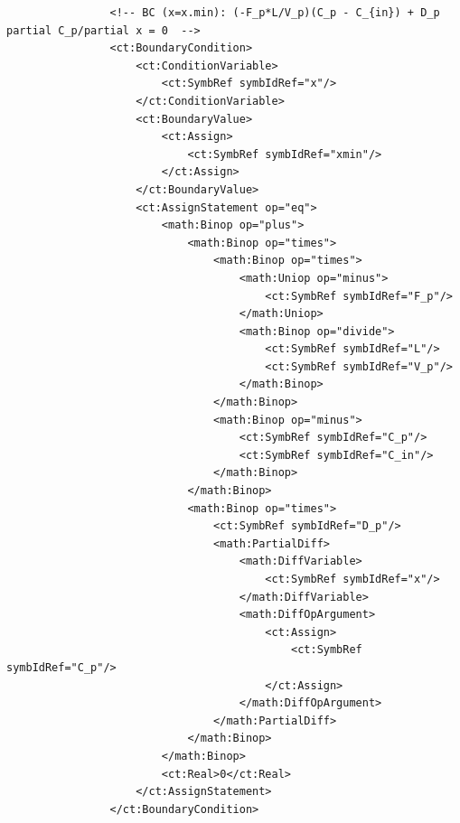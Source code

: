 \lstset{language=XML}
\begin{lstlisting}
                <!-- BC (x=x.min): (-F_p*L/V_p)(C_p - C_{in}) + D_p partial C_p/partial x = 0  -->                
                <ct:BoundaryCondition>
                    <ct:ConditionVariable>
                        <ct:SymbRef symbIdRef="x"/>
                    </ct:ConditionVariable>
                    <ct:BoundaryValue>
                        <ct:Assign>
                            <ct:SymbRef symbIdRef="xmin"/>
                        </ct:Assign>
                    </ct:BoundaryValue>
                    <ct:AssignStatement op="eq">
                        <math:Binop op="plus">
                            <math:Binop op="times">
                                <math:Binop op="times">
                                    <math:Uniop op="minus">
                                        <ct:SymbRef symbIdRef="F_p"/>
                                    </math:Uniop>
                                    <math:Binop op="divide">
                                        <ct:SymbRef symbIdRef="L"/>
                                        <ct:SymbRef symbIdRef="V_p"/>
                                    </math:Binop>
                                </math:Binop>
                                <math:Binop op="minus">
                                    <ct:SymbRef symbIdRef="C_p"/>
                                    <ct:SymbRef symbIdRef="C_in"/>
                                </math:Binop>
                            </math:Binop>
                            <math:Binop op="times">
                                <ct:SymbRef symbIdRef="D_p"/>
                                <math:PartialDiff>
                                    <math:DiffVariable>
                                        <ct:SymbRef symbIdRef="x"/>
                                    </math:DiffVariable>
                                    <math:DiffOpArgument>
                                        <ct:Assign>
                                            <ct:SymbRef symbIdRef="C_p"/>
                                        </ct:Assign>
                                    </math:DiffOpArgument>
                                </math:PartialDiff>
                            </math:Binop>
                        </math:Binop>
                        <ct:Real>0</ct:Real>
                    </ct:AssignStatement>
                </ct:BoundaryCondition>
                

\end{lstlisting}
